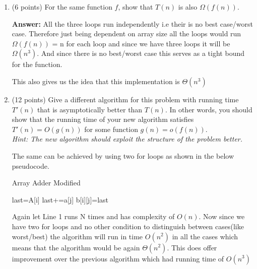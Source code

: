 \documentclass[11pt]{article}
\newcommand{\ans}{\textbf{Answer: }}
\begin{document}
\begin{enumerate}
\begin{enumerate}
\ans
Let f(n) be the combined complexity of all the three for loops. Now since the algorithm does not depend on best/worst case scenario, we can see that Line 1 has complexity of $O(n)$ and similarly for Line 2 and Line 4. This means that the total complexity of the algorithm is $O(n^3)$. In other words the algorithm cannot be made to give better performance in some cases(dependent on type of input.)


\item (6 points) For the same function $f$, show that $T(n)$ is also $\Omega( f(n) )$. 

\ans All the three loops run independently i.e their is no best case/worst case. Therefore just being dependent on array size all the loops would run $\Omega(f(n))$ = n for each loop and since we have three loops  it will be $\Omega(n^3)$. And since there is no best/worst case this serves as a tight bound for the function. 

This also gives us the idea that this implementation is $\Theta(n^3)$
\newpage

\item (12 points) Give a different algorithm for this problem with running time $T'(n)$ 
that is asymptotically better than $T(n)$. In other words, you should show 
that the running time of your new algorithm satisfies $T'(n)= O(g(n))$ for
some function $g(n) = o( f(n) )$.  \\
{\em Hint: The new algorithm should exploit 
the structure of the problem better.}

The same can be achieved by using two for loops as shown in the below pseudocode.

\begin{algorithm}
\caption{Array Adder Modified}\label{euclid}
\begin{algorithmic}[1]
\State last=A[i]
\State last+=a[j]
\State b[i][j]=last
\EndFor
\EndFor
\end{algorithmic}
\end{algorithm}
Again let Line 1 runs N times and has complexity of $O(n)$. Now since we have two for loops and no other condition to distinguish between cases(like worst/best) the algorithm will run in time $O(n^2)$ in all the cases which means that the algorithm would be again $\Theta(n^2)$. This does offer improvement over the previous algorithm which had running time of $O(n^3)$

\end{enumerate}



\end{enumerate}
\end{document}
